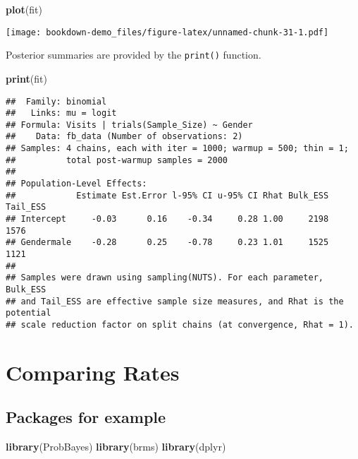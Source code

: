 \documentclass[
]{book}
\newenvironment{Shaded}{\begin{snugshade}}{\end{snugshade}}
\newcommand{\KeywordTok}[1]{\textcolor[rgb]{0.13,0.29,0.53}{\textbf{#1}}}
\newcommand{\NormalTok}[1]{#1}
\begin{document}
\begin{Shaded}
\begin{Highlighting}[]
\KeywordTok{plot}\NormalTok{(fit)}
\end{Highlighting}
\end{Shaded}

\texttt{[image: bookdown-demo\_files/figure-latex/unnamed-chunk-31-1.pdf]}

Posterior summaries are provided by the \texttt{print()} function.

\begin{Shaded}
\begin{Highlighting}[]
\KeywordTok{print}\NormalTok{(fit)}
\end{Highlighting}
\end{Shaded}

\begin{verbatim}
##  Family: binomial 
##   Links: mu = logit 
## Formula: Visits | trials(Sample_Size) ~ Gender 
##    Data: fb_data (Number of observations: 2) 
## Samples: 4 chains, each with iter = 1000; warmup = 500; thin = 1;
##          total post-warmup samples = 2000
## 
## Population-Level Effects: 
##            Estimate Est.Error l-95% CI u-95% CI Rhat Bulk_ESS Tail_ESS
## Intercept     -0.03      0.16    -0.34     0.28 1.00     2198     1576
## Gendermale    -0.28      0.25    -0.78     0.23 1.01     1525     1121
## 
## Samples were drawn using sampling(NUTS). For each parameter, Bulk_ESS
## and Tail_ESS are effective sample size measures, and Rhat is the potential
## scale reduction factor on split chains (at convergence, Rhat = 1).
\end{verbatim}

\hypertarget{comparing-rates}{%
\chapter{Comparing Rates}\label{comparing-rates}}

\hypertarget{packages-for-example}{%
\section{Packages for example}\label{packages-for-example}}

\begin{Shaded}
\begin{Highlighting}[]
\KeywordTok{library}\NormalTok{(ProbBayes)}
\KeywordTok{library}\NormalTok{(brms)}
\KeywordTok{library}\NormalTok{(dplyr)}
\end{Highlighting}
\end{Shaded}
\end{document}
